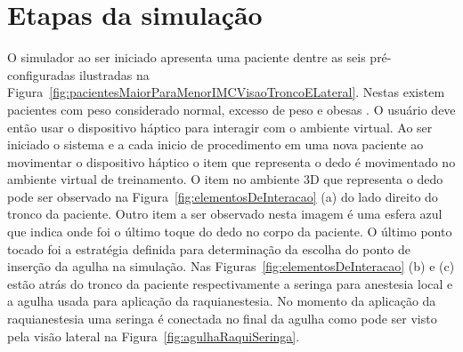 
\section {Etapas da simulação}

O simulador ao ser iniciado apresenta uma paciente dentre as seis pré-configuradas ilustradas na Figura~\ref{fig:pacientesMaiorParaMenorIMCVisaoTroncoELateral}. Nestas existem pacientes com peso considerado normal, excesso de peso e obesas \cite{MTILLC2019}. O usuário deve então usar o dispositivo háptico para interagir com o ambiente virtual. Ao ser iniciado o sistema e a cada inicio de procedimento em uma nova paciente ao movimentar o dispositivo háptico o item que representa o dedo é movimentado no ambiente virtual de treinamento. O item no ambiente 3D que representa o dedo pode ser observado na Figura~\ref{fig:elementosDeInteracao} (a) do lado direito do tronco da paciente. Outro item a ser observado nesta imagem é uma esfera azul que indica onde foi o último toque do dedo no corpo da paciente. O último ponto tocado foi a estratégia definida para determinação da escolha do ponto de inserção da agulha na simulação. Nas Figuras~\ref{fig:elementosDeInteracao} (b) e (c) estão atrás do tronco da paciente respectivamente a seringa para anestesia local e a agulha usada para aplicação da raquianestesia. No momento da aplicação da raquianestesia uma seringa é conectada no final da agulha como pode ser visto pela visão lateral na Figura~\ref{fig:agulhaRaquiSeringa}.

